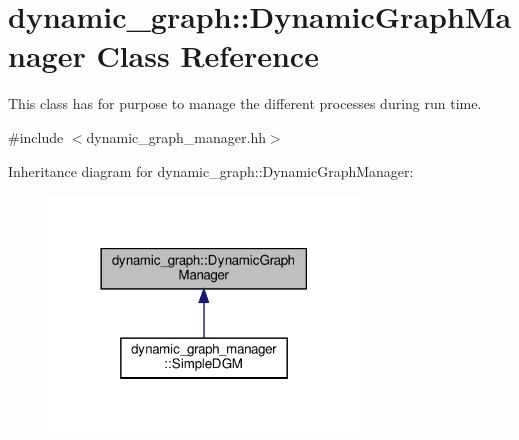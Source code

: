\hypertarget{classdynamic__graph_1_1DynamicGraphManager}{}\section{dynamic\+\_\+graph\+:\+:Dynamic\+Graph\+Manager Class Reference}
\label{classdynamic__graph_1_1DynamicGraphManager}


This class has for purpose to manage the different processes during run time.  




{\ttfamily \#include $<$dynamic\+\_\+graph\+\_\+manager.\+hh$>$}



Inheritance diagram for dynamic\+\_\+graph\+:\+:Dynamic\+Graph\+Manager\+:
\nopagebreak
\begin{figure}[H]
\begin{center}
\leavevmode
\includegraphics[width=234pt]{classdynamic__graph_1_1DynamicGraphManager__inherit__graph}
\end{center}
\end{figure}
